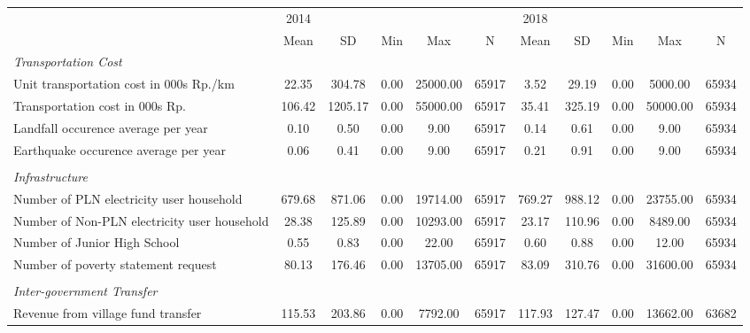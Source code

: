 \begin{tabular}{l*{2}{ccccc}}
\toprule
                &     2014&         &         &         &         &     2018&         &         &         &         \\
                &     Mean&       SD&      Min&      Max&        N&     Mean&       SD&      Min&      Max&        N\\
\midrule
\emph{Transportation Cost}&         &         &         &         &         &         &         &         &         &         \\
\hspace{0.25cm} Unit transportation cost in 000s Rp./km&    22.35&   304.78&     0.00& 25000.00&    65917&     3.52&    29.19&     0.00&  5000.00&    65934\\
\hspace{0.25cm} Transportation cost in 000s Rp.&   106.42&  1205.17&     0.00& 55000.00&    65917&    35.41&   325.19&     0.00& 50000.00&    65934\\
\hspace{0.25cm} Landfall occurence average per year&     0.10&     0.50&     0.00&     9.00&    65917&     0.14&     0.61&     0.00&     9.00&    65934\\
\hspace{0.25cm} Earthquake occurence average per year&     0.06&     0.41&     0.00&     9.00&    65917&     0.21&     0.91&     0.00&     9.00&    65934\\
\vspace{0.05em} \\ \emph{Infrastructure}&         &         &         &         &         &         &         &         &         &         \\
\hspace{0.25cm} Number of PLN electricity user household&   679.68&   871.06&     0.00& 19714.00&    65917&   769.27&   988.12&     0.00& 23755.00&    65934\\
\hspace{0.25cm} Number of Non-PLN electricity user household&    28.38&   125.89&     0.00& 10293.00&    65917&    23.17&   110.96&     0.00&  8489.00&    65934\\
\hspace{0.25cm} Number of Junior High School&     0.55&     0.83&     0.00&    22.00&    65917&     0.60&     0.88&     0.00&    12.00&    65934\\
\hspace{0.25cm} Number of poverty statement request&    80.13&   176.46&     0.00& 13705.00&    65917&    83.09&   310.76&     0.00& 31600.00&    65934\\
\vspace{0.05em} \\ \emph{Inter-government Transfer}&         &         &         &         &         &         &         &         &         &         \\
\hspace{0.25cm} Revenue from village fund transfer&   115.53&   203.86&     0.00&  7792.00&    65917&   117.93&   127.47&     0.00& 13662.00&    63682\\
\bottomrule
\end{tabular}
